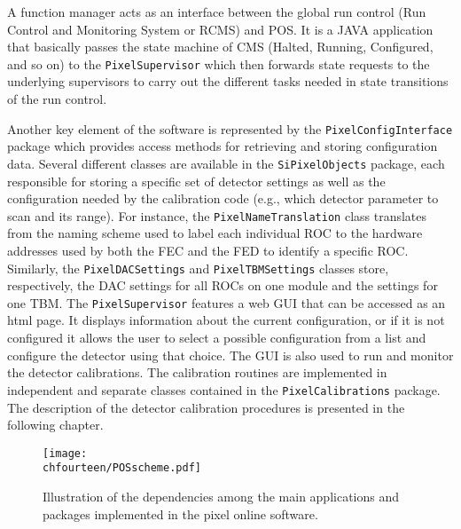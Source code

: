 A function manager acts as an interface between the global run control (Run Control and Monitoring System or RCMS) and POS.
It is a JAVA application that basically passes the state machine of CMS (Halted, Running, Configured, and so on) to the \texttt{PixelSupervisor} which then forwards state requests to the underlying supervisors to carry out the different tasks needed in state transitions of the run control.

Another key element of the software is represented by the \texttt{PixelConfigInterface} package which provides access methods for retrieving and storing configuration data.
Several different classes are available in the \texttt{SiPixelObjects} package, each responsible for storing a specific set of detector settings as well as the configuration needed by the calibration code (e.g., which detector parameter to scan and its range).
For instance, the \texttt{PixelNameTranslation} class translates from the naming scheme used to label each individual ROC to the hardware addresses used by both the FEC and the FED to identify a specific ROC.
Similarly, the \texttt{PixelDACSettings} and \texttt{PixelTBMSettings} classes store, respectively, the DAC settings for all ROCs on one module and the settings for one TBM.
The \texttt{PixelSupervisor} features a web GUI that can be accessed as an html page.
It displays information about the current configuration, or if it is not configured it allows the user to select a possible configuration from a list and configure the detector using that choice.
The GUI is also used to run and monitor the detector calibrations.
The calibration routines are implemented in independent and separate classes contained in the \texttt{PixelCalibrations} package.
The description of the detector calibration procedures is presented in the following chapter.

\begin{figure}[!t]
 \begin{center}
 \texttt{[image: \\chfourteen/POSscheme.pdf]}
 \end{center}
 \caption{Illustration of the dependencies among the main applications and packages implemented in the pixel online software.}
 \label{fig:POS}
\end{figure}


